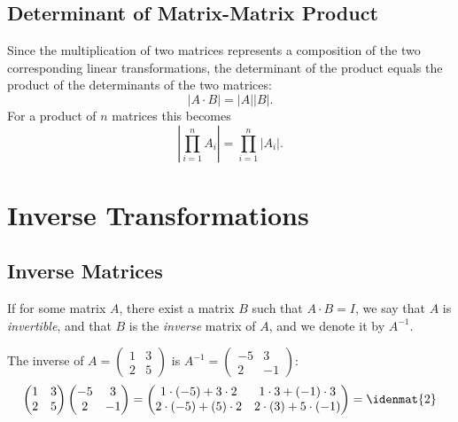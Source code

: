 \subsection{Determinant of Matrix-Matrix Product}
Since the multiplication of two matrices represents a composition of the two corresponding linear transformations, the determinant of the product equals the product of the determinants of the two matrices:
\begin{equation*}
  \left|A\cdot B\right| = |A||B|.
\end{equation*}
For a product of $n$ matrices this becomes
\begin{equation*}
  \left| \prod\limits_{i=1}^{n}A_{i}\right| = \prod\limits_{i=1}^{n}\left|A_{i}\right|.
\end{equation*}

\section{Inverse Transformations}
\subsection{Inverse Matrices}
If for some matrix $A$, there exist a matrix $B$ such that $A\cdot B=I$, we say that $A$ is \emph{invertible}, and that $B$ is the \emph{inverse} matrix of $A$, and we denote it by $A^{-1}$.

\begin{example}
  
  The inverse of $A=\begin{pmatrix}1&3\\2&5\end{pmatrix}$ is $A^{-1}=\begin{pmatrix}-5&3\\2&-1\end{pmatrix}$:
  \begin{equation*}
	\begin{pmatrix}
	  1&3\\
	  2&5
	\end{pmatrix}
	\begin{pmatrix}
	  -5&3\\
	  2&-1
	\end{pmatrix}=
	\begin{pmatrix}
	  1\cdot(-5)+3\cdot2 & 1\cdot3 + (-1)\cdot3\\
	  2\cdot(-5) + (5)\cdot2 & 2\cdot(3)+5\cdot(-1)
	\end{pmatrix}=
	\idenmat{2}
  \end{equation*}
\end{example}

